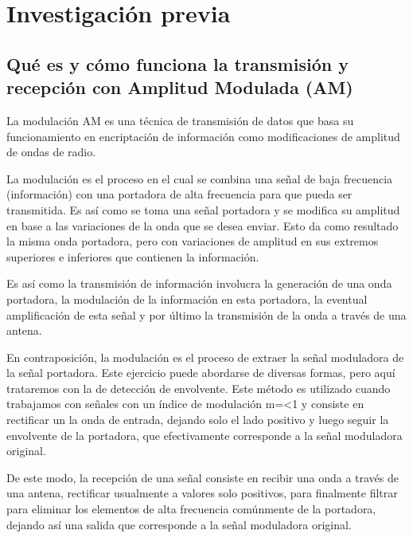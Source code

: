 \section{Investigación previa}

\subsection{Qué es y cómo funciona la transmisión y recepción con Amplitud Modulada (AM)}
La modulación AM es una técnica de transmisión de datos que basa su funcionamiento en encriptación de información como modificaciones 
de amplitud de ondas de radio.
 
La modulación es el proceso en el cual se combina una señal de baja frecuencia (información) con una portadora de alta frecuencia para 
que pueda ser transmitida. Es así como se toma una señal portadora y se modifica su amplitud en base a las variaciones de la onda que se desea enviar. Esto da como resultado la misma onda portadora, pero con variaciones de amplitud en sus extremos superiores e inferiores que contienen la información.

Es así como la transmisión de información involucra la generación de una onda portadora, la modulación de la información en esta 
portadora, la eventual amplificación de esta señal y por último la transmisión de la onda a través de una antena.

En contraposición, la modulación es el proceso de extraer la señal moduladora de la señal portadora. Este ejercicio puede abordarse de 
diversas formas, pero aquí trataremos con la de detección de envolvente. Este método es utilizado cuando trabajamos con señales con un 
índice de modulación m=<1 y consiste en rectificar un la onda de entrada, dejando solo el lado positivo y luego seguir la envolvente de 
la portadora, que efectivamente corresponde a la señal moduladora original.

De este modo, la recepción de una señal consiste en recibir una onda a través de una antena, rectificar usualmente a valores solo 
positivos, para finalmente filtrar para eliminar los elementos de alta frecuencia comúnmente de la portadora, dejando así una salida 
que corresponde a la señal moduladora original.


